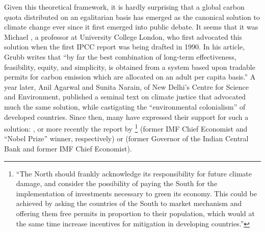 \documentclass[a5paper,english,openany]{memoir}
\begin{document}
Given this theoretical framework, it is hardly surprising that a global carbon quota distributed on an egalitarian basis has emerged as the canonical solution to climate change ever since it first emerged into public debate. It seems that it was Michael \citet{grubb_greenhouse_1990}, a professor at University College London, who first advocated this solution when the first IPCC report was being drafted in 1990. In his article, Grubb writes that ``by far the best combination of long-term effectiveness, feasibility, equity, and simplicity, is obtained from a system based upon tradable permits for carbon emission which are allocated on an adult per capita basis.'' A year later, Anil Agarwal and Sunita Narain, of New Delhi's Centre for Science and Environment, published a seminal text on climate justice that advocated much the same solution, while castigating the ``environmental colonialism'' of developed countries. %
Since then, many have expressed their support for such a solution: \citet{bertram_tradeable_1992,baer_equity_2000,jamieson_climate_2001}, or more recently the report by \citet{blanchard_major_2021}\footnote{``The North should
frankly acknowledge its responsibility for future climate damage, and
consider the possibility of paying the South for the implementation of investments
necessary to green its economy. This could be achieved by asking the countries of the South to %
market mechanism and offering them free permits in proportion to their population, which would at the same time increase incentives for mitigation in developing countries.''} (former IMF Chief Economist and ``Nobel Prize'' winner, respectively) or \citet{rajan_global_2021} (former Governor of the Indian Central Bank and former IMF Chief Economist). 
\end{document}

